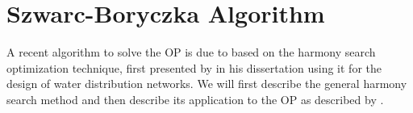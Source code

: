 \section{Szwarc-Boryczka Algorithm}
\label{sec:04:szwarc}

A recent algorithm to solve the OP is due to \citeauthor{szwarc_novel_2022} \cite{szwarc_novel_2022} based on the harmony search optimization technique, 
first presented by \citeauthor{geem_optimal_2000} in his dissertation using it for the design of water distribution networks. \cite{geem_optimal_2000}
We will first describe the general harmony search method and then describe its application to the OP as described by \citeauthor{szwarc_novel_2022}.




